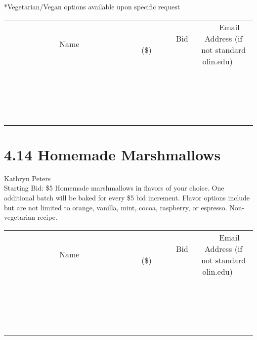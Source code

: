 \documentclass[11pt]{article}
\begin{document}
*Vegetarian/Vegan options available upon specific request
\\[3ex]
\begin{tabular}{c c c}
~~~~~~~~~~~~~Name~~~~~~~~~~~~~ & ~~~~~~~~~Bid (\$)~~~~~~~~~  & ~~~Email Address (if not standard olin.edu)~~~\\
 & & \\
\hline
 & & \\
\hline
 & & \\
\hline
 & & \\
\hline
 & & \\
\hline
 & & \\
\hline
 & & \\
\hline
 & & \\
\hline
 & & \\
\hline
 & & \\
\hline
 & & \\
\hline
 & & \\
\hline
 & & \\
\hline
 & & \\
\hline
 & & \\
\hline
 & & \\
\hline
 & & \\
\hline
 & & \\
\hline
 & & \\
\hline
\end{tabular}
\newpage
\section*{4.14 Homemade Marshmallows}
Kathryn Peters
\\
Starting Bid: \$5
\newline
Homemade marshmallows in flavors of your choice. One additional batch will be baked for every \$5 bid increment. Flavor options include but are not limited to orange, vanilla, mint, cocoa, raspberry, or espresso. Non-vegetarian recipe.
\\[3ex]
\begin{tabular}{c c c}
~~~~~~~~~~~~~Name~~~~~~~~~~~~~ & ~~~~~~~~~Bid (\$)~~~~~~~~~  & ~~~Email Address (if not standard olin.edu)~~~\\
 & & \\
\hline
 & & \\
\hline
 & & \\
\hline
 & & \\
\hline
 & & \\
\hline
 & & \\
\hline
 & & \\
\hline
 & & \\
\hline
 & & \\
\hline
 & & \\
\hline
 & & \\
\hline
 & & \\
\hline
 & & \\
\hline
 & & \\
\hline
 & & \\
\hline
 & & \\
\hline
 & & \\
\hline
 & & \\
\hline
 & & \\
\hline
\end{tabular}
\newpage
\end{document}

